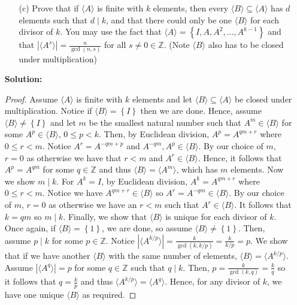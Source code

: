 \documentclass[letterpaper,12pt]{article}
\newcommand{\set}[1]{\left\{ #1 \right\}}
\theoremstyle{definition}
\begin{document}
\begin{enumerate}
    \item[] \begin{enumerate}
        \item[(c)] Prove that if $\langle A \rangle$ is finite with $k$ elements, then every $\langle B \rangle \subseteq \langle A \rangle$ has $d$ elements such that $d \mid k$, and that there could only be one $\langle B \rangle$ for each divisor of $k$. You may use the fact that $\langle A \rangle = \set{I, A, A^2, \ldots, A^{k-1}}$ and that $| \langle A^s \rangle | = \frac{n}{\gcd (n,s)}$ for all $s \neq 0 \in \mathbb{Z}$. (Note $\langle B \rangle$ also has to be closed under multiplication) 
    \end{enumerate}
    \begin{mdframed}
        \textbf{Solution:}
\begin{proof}
    Assume $\langle A \rangle$ is finite with $k$ elements and let $\langle B \rangle \subseteq \langle A \rangle$ be closed under multiplication. Notice if $\langle B \rangle = \set{I}$ then we are done. Hence, assume $\langle B \rangle \neq \set{I}$ and let $m$ be the smallest natural number such that $A^m \in \langle B \rangle$ for some $A^p \in \langle B \rangle$, $0 \leq p < k$. Then, by Euclidean division, $A^p = A^{qm+r}$ where $0 \leq r < m$. Notice $A^r = A^{-qm + p}$ and $A^{-qm}, A^p \in \langle B \rangle$. By our choice of $m$, $r = 0$ as otherwise we have that $r < m$ and $A^r \in \langle B \rangle$. Hence, it follows that $A^p = A^{qm}$ for some $q \in \mathbb{Z}$ and thus $\langle B \rangle = \langle A^m \rangle$, which has $m$ elements. Now we show $m \mid k$. For $A^k = I$, by Euclidean division, $A^k = A^{qm+r}$ where $0 \leq r < m$. Notice we have $A^{qm+r} \in \langle B \rangle$ so $A^r = A^{-qm} \in \langle B \rangle$. By our choice of $m$, $r = 0$ as otherwise we have an $r < m$ such that $A^r \in \langle B \rangle$. It follows that $k = qm$ so $m \mid k$. Finally, we show that $\langle B \rangle$ is unique for each divisor of $k$. Once again, if $\langle B \rangle = \set{1}$, we are done, so assume $\langle B \rangle \neq \set{1}$. Then, assume $p \mid k$ for some $p \in \mathbb{Z}$. Notice $|\langle A^{k/p} \rangle | = \frac{k}{\gcd (k,k/p)} = \frac{k}{k/p} = p$. We show that if we have another $\langle B \rangle$ with the same number of elements, $\langle B \rangle = \langle A^{k/p} \rangle$. Assume $|\langle A^q \rangle|=p$ for some $q \in \mathbb{Z}$ such that $q \mid k$. Then, $p = \frac{k}{\gcd(k,q)} = \frac{k}{q}$ so it follows that $q = \frac{k}{p}$ and thus $\langle A^{k/p} \rangle  = \langle A^q \rangle$. Hence, for any divisor of $k$, we have one unique $\langle B \rangle$ as required.
\end{proof}
    \end{mdframed}
\end{enumerate}
\end{document}
